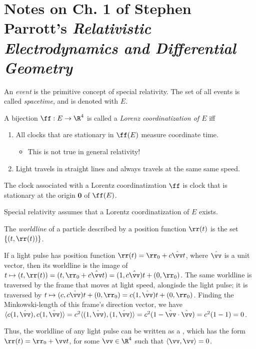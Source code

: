 \newpage

\section*{Notes on Ch. 1 of Stephen Parrott's \textit{Relativistic Electrodynamics and Differential Geometry}}

An \textit{event} is the primitive concept of special relativity. The set of all events is called \textit{spacetime}, and is denoted with $E$.

\vspace{.5cm}

A bijection $\ff:E \rightarrow \R^4$ is called a \textit{Lorenz coordinatization of $E$} iff 
\begin{enumerate}
	\item All clocks that are stationary in $\ff(E)$ measure coordinate time.
	\begin{itemize}
		\item This is not true in general relativity!
	\end{itemize}
	\item Light travels in straight lines and always travels at the same same speed.
\end{enumerate}

The clock associated with a Lorentz coordinatization $\ff$ is clock that is stationary at the origin $\mathbf{0}$ of $\ff(E)$.

Special relativity assumes that a Lorentz coordinatization of $E$ exists.

\vspace{.5cm}

The \textit{worldline} of a particle described by a position function $\rr(t)$ is the set $\{(t, \rr(t))\}$.

If a light pulse has position function $\rr(t) = \rr_0 + c\hat{\vv} t$, where $\hat{\vv}$ is a unit vector, then its worldline is the image of $t \mapsto (t, \rr(t)) = (t, \rr_0 + c\hat{\vv} t) = (1, c\hat{\vv}) t + (0, \rr_0)$. The same worldline is traversed by the frame that moves at light speed, alongisde the light pulse; it is traversed by $t \mapsto (c, c \hat{\vv}) t + (0, \rr_0) = c(1, \hat{\vv})t + (0, \rr_0)$. Finding the Minkowski-length of this frame's direction vector, we have $\langle c(1, \hat{\vv}), c(1, \hat{\vv})\rangle = c^2\langle(1, \hat{\vv}), (1, \hat{\vv})\rangle = c^2(1 - \hat{\vv} \cdot \hat{\vv}) = c^2 (1 - 1) = 0$.

Thus, the worldline of any light pulse can be written as a  , which has the form $\rr(t) = \rr_0 + \vv t$, for some $\vv \in \R^4$ such that $\langle \vv, \vv \rangle = 0$.

